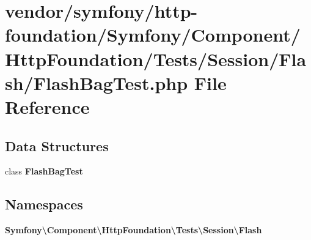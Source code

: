 \section{vendor/symfony/http-\/foundation/\+Symfony/\+Component/\+Http\+Foundation/\+Tests/\+Session/\+Flash/\+Flash\+Bag\+Test.php File Reference}
\label{_flash_bag_test_8php}
\subsection*{Data Structures}
\begin{DoxyCompactItemize}
\item 
class {\bf Flash\+Bag\+Test}
\end{DoxyCompactItemize}
\subsection*{Namespaces}
\begin{DoxyCompactItemize}
\item 
 {\bf Symfony\textbackslash{}\+Component\textbackslash{}\+Http\+Foundation\textbackslash{}\+Tests\textbackslash{}\+Session\textbackslash{}\+Flash}
\end{DoxyCompactItemize}
